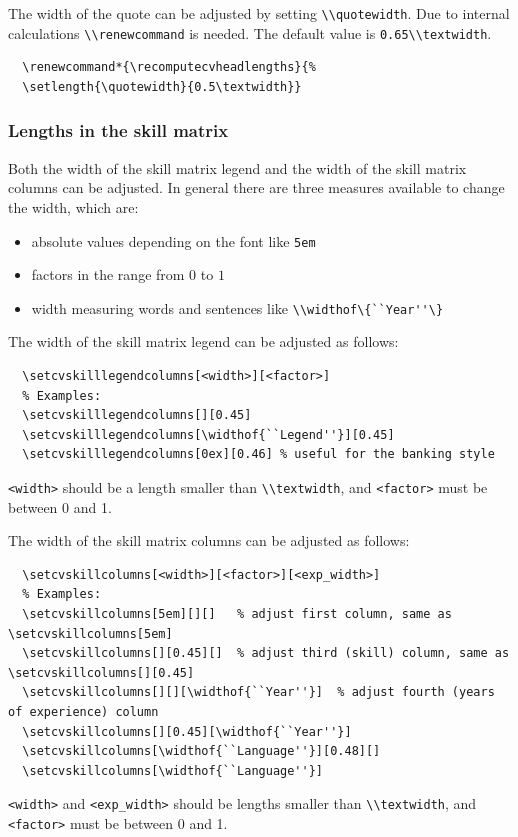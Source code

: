\documentclass[a4paper, 11pt]{article}
\newcommand{\code}[1]{\lstinline!#1!}
\begin{document}
The width of the quote can be adjusted by setting \code{\\quotewidth}. Due to internal calculations \code{\\renewcommand} is needed. The default value is \code{0.65\\textwidth}.
\begin{lstlisting}
  \renewcommand*{\recomputecvheadlengths}{%
  \setlength{\quotewidth}{0.5\textwidth}}
\end{lstlisting}




\subsubsection{Lengths in the skill matrix}
\label{section:length:skillmatrix}
Both the width of the skill matrix legend and the width of the skill matrix columns can be adjusted. In general there are three measures available to change the width, which are:
\begin{itemize}
\item absolute values depending on the font like \code{5em}
\item factors in the range from $0$ to $1$
\item width measuring words and sentences like \code{\\widthof\{``Year''\}}
\end{itemize}


The width of the skill matrix legend can be adjusted as follows:
\begin{lstlisting}
  \setcvskilllegendcolumns[<width>][<factor>]
  % Examples:
  \setcvskilllegendcolumns[][0.45]
  \setcvskilllegendcolumns[\widthof{``Legend''}][0.45]
  \setcvskilllegendcolumns[0ex][0.46] % useful for the banking style
\end{lstlisting}
\code{<width>} should be a length smaller than \code{\\textwidth}, and \code{<factor>} must be between 0 and 1.

The width of the skill matrix columns can be adjusted as follows:
\begin{lstlisting}
  \setcvskillcolumns[<width>][<factor>][<exp_width>]
  % Examples:
  \setcvskillcolumns[5em][][]   % adjust first column, same as \setcvskillcolumns[5em]
  \setcvskillcolumns[][0.45][]  % adjust third (skill) column, same as \setcvskillcolumns[][0.45]
  \setcvskillcolumns[][][\widthof{``Year''}]  % adjust fourth (years of experience) column
  \setcvskillcolumns[][0.45][\widthof{``Year''}]
  \setcvskillcolumns[\widthof{``Language''}][0.48][]
  \setcvskillcolumns[\widthof{``Language''}]
\end{lstlisting}
\code{<width>} and \code{<exp_width>} should be lengths smaller than \code{\\textwidth}, and \code{<factor>} must be between 0 and 1.
\end{document}
